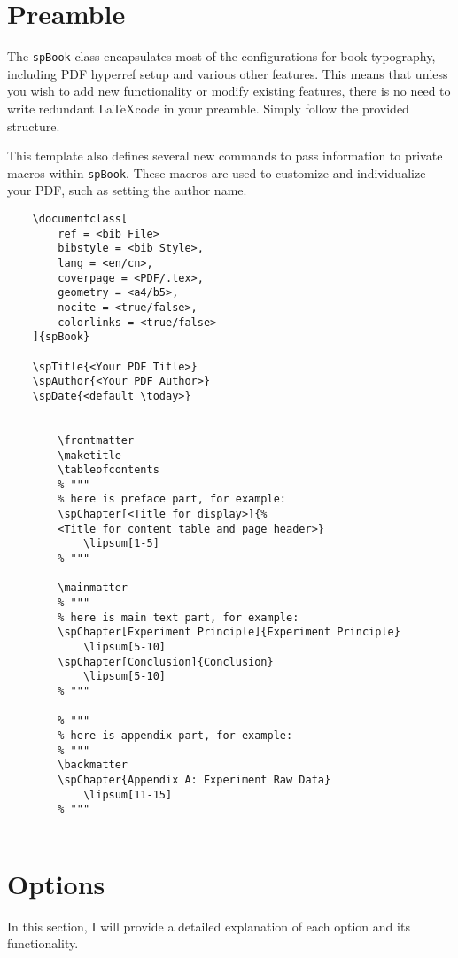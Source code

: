
\section{Preamble}
The \texttt{spBook} class encapsulates most of the configurations for book typography, including PDF hyperref setup and various other features. This means that unless you wish to add new functionality or modify existing features, there is no need to write redundant \LaTeX code in your preamble. Simply follow the provided structure.

This template also defines several new commands to pass information to private macros within \texttt{spBook}. These macros are used to customize and individualize your PDF, such as setting the author name.

\begin{Verbatim}
    \documentclass[
        ref = <bib File>
        bibstyle = <bib Style>,
        lang = <en/cn>,
        coverpage = <PDF/.tex>,
        geometry = <a4/b5>,
        nocite = <true/false>,
        colorlinks = <true/false>
    ]{spBook}

    \spTitle{<Your PDF Title>}
    \spAuthor{<Your PDF Author>}
    \spDate{<default \today>}

    
        \frontmatter
        \maketitle
        \tableofcontents
        % """
        % here is preface part, for example:
        \spChapter[<Title for display>]{%
        <Title for content table and page header>}
            \lipsum[1-5]
        % """

        \mainmatter
        % """
        % here is main text part, for example:
        \spChapter[Experiment Principle]{Experiment Principle}
            \lipsum[5-10]
        \spChapter[Conclusion]{Conclusion}
            \lipsum[5-10]
        % """

        % """
        % here is appendix part, for example:
        % """
        \backmatter
        \spChapter{Appendix A: Experiment Raw Data}
            \lipsum[11-15]
        % """
    
\end{Verbatim}

\section{Options}
    In this section, I will provide a detailed explanation of each option and its functionality.

